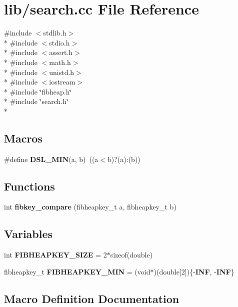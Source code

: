 \section{lib/search.cc File Reference}
\label{search_8cc}
{\ttfamily \#include $<$stdlib.\-h$>$}\\*
{\ttfamily \#include $<$stdio.\-h$>$}\\*
{\ttfamily \#include $<$assert.\-h$>$}\\*
{\ttfamily \#include $<$math.\-h$>$}\\*
{\ttfamily \#include $<$unistd.\-h$>$}\\*
{\ttfamily \#include $<$iostream$>$}\\*
{\ttfamily \#include \char`\"{}fibheap.\-h\char`\"{}}\\*
{\ttfamily \#include \char`\"{}search.\-h\char`\"{}}\\*
\subsection*{Macros}
\begin{DoxyCompactItemize}
\item 
\#define {\bf D\-S\-L\-\_\-\-M\-I\-N}(a, b)~((a$<$b)?(a)\-:(b))
\end{DoxyCompactItemize}
\subsection*{Functions}
\begin{DoxyCompactItemize}
\item 
int {\bf fibkey\-\_\-compare} (fibheapkey\-\_\-t a, fibheapkey\-\_\-t b)
\end{DoxyCompactItemize}
\subsection*{Variables}
\begin{DoxyCompactItemize}
\item 
int {\bf F\-I\-B\-H\-E\-A\-P\-K\-E\-Y\-\_\-\-S\-I\-Z\-E} = 2$\ast$sizeof(double)
\item 
fibheapkey\-\_\-t {\bf F\-I\-B\-H\-E\-A\-P\-K\-E\-Y\-\_\-\-M\-I\-N} = (void$\ast$)(double[2])\{-\/{\bf I\-N\-F}, -\/{\bf I\-N\-F}\}
\end{DoxyCompactItemize}


\subsection{Macro Definition Documentation}
